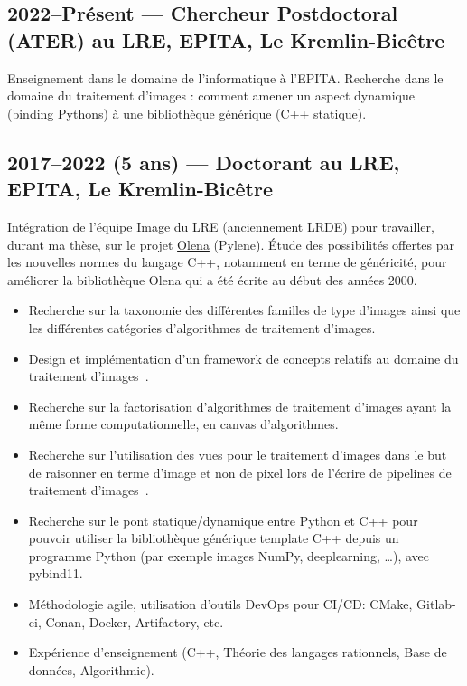 \documentclass[11pt,a4paper,sans]{article} %
\begin{document}
\subsection{2022--Présent --- Chercheur Postdoctoral (ATER) au LRE, EPITA, Le Kremlin-Bicêtre}

Enseignement dans le domaine de l'informatique à l'EPITA.
Recherche dans le domaine du traitement d'images : comment amener un aspect dynamique (binding Pythons) à une
bibliothèque générique (C++ statique).

\subsection{2017--2022 (5 ans) --- Doctorant au LRE, EPITA, Le Kremlin-Bicêtre}

Intégration de l'équipe Image du LRE (anciennement LRDE) pour travailler, durant ma thèse, sur le projet
\href{https://www.lre.epita.fr/wiki/Olena}{Olena} (Pylene). \'Etude des possibilités offertes par les nouvelles normes
du langage C++, notamment en terme de généricité, pour améliorer la bibliothèque Olena qui a été écrite au début des
années 2000.
\begin{itemize}
  \item Recherche sur la taxonomie des différentes familles de type d'images ainsi que les différentes catégories
        d'algorithmes de traitement d'images.
  \item Design et implémentation d'un framework de concepts relatifs au domaine du traitement
        d'images~\parencite{roynard.2019.rrpr}.
  \item Recherche sur la factorisation d'algorithmes de traitement d'images ayant la même forme computationnelle, en
        canvas d'algorithmes.
  \item Recherche sur l'utilisation des vues pour le traitement d'images dans le but de raisonner en terme d'image et
        non de pixel lors de l'écrire de pipelines de traitement d'images~\parencite{roynard.2022.gpce}.
  \item Recherche sur le pont statique/dynamique entre Python et C++ pour pouvoir utiliser la bibliothèque générique
        template C++ depuis un programme Python (par exemple images NumPy, deeplearning, \ldots), avec pybind11.
  \item Méthodologie agile, utilisation d'outils DevOps pour CI/CD: CMake, Gitlab-ci, Conan, Docker, Artifactory, etc.
  \item Expérience d'enseignement (C++, Théorie des langages rationnels, Base de données, Algorithmie).
\end{itemize}
\end{document}
